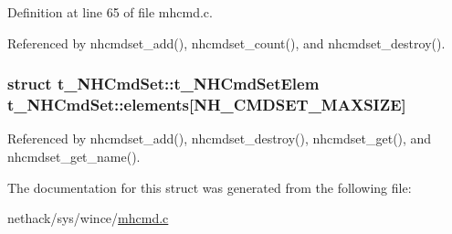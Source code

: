 Definition at line 65 of file mhcmd.\+c.



Referenced by nhcmdset\+\_\+add(), nhcmdset\+\_\+count(), and nhcmdset\+\_\+destroy().

\hypertarget{structt__NHCmdSet_a923145ebecc20823fd02173c7223fce3}{
\subsubsection[{elements}]{\setlength{\rightskip}{0pt plus 5cm}struct {\bf t\+\_\+\+N\+H\+Cmd\+Set\+::t\+\_\+\+N\+H\+Cmd\+Set\+Elem}  t\+\_\+\+N\+H\+Cmd\+Set\+::elements\mbox{[}{\bf N\+H\+\_\+\+C\+M\+D\+S\+E\+T\+\_\+\+M\+A\+X\+S\+I\+Z\+E}\mbox{]}}}\label{structt__NHCmdSet_a923145ebecc20823fd02173c7223fce3}


Referenced by nhcmdset\+\_\+add(), nhcmdset\+\_\+destroy(), nhcmdset\+\_\+get(), and nhcmdset\+\_\+get\+\_\+name().



The documentation for this struct was generated from the following file\+:\begin{DoxyCompactItemize}
\item 
nethack/sys/wince/\hyperlink{mhcmd_8c}{mhcmd.\+c}\end{DoxyCompactItemize}
